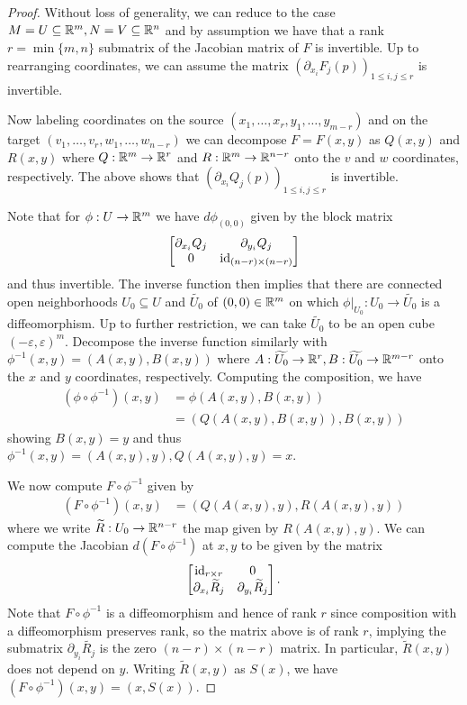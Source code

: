 \begin{proof}
    Without loss of generality, we can reduce to the case $M=U\subseteq\mathbb{R}^{m},N=V\subseteq\mathbb{R}^{n}$ and by assumption we have that a rank $r=\min\{m,n\}$ submatrix of the Jacobian matrix of $F$ is invertible. Up to rearranging coordinates, we can assume the matrix $(\partial_{x_{i}}F_{j}(p))_{1\leq i,j\leq r}$ is invertible. 

    Now labeling coordinates on the source $(x_{1},\dots,x_{r},y_{1},\dots,y_{m-r})$ and on the target $(v_{1},\dots,v_{r},w_{1},\dots,w_{n-r})$ we can decompose $F=F(x,y)$ as $Q(x,y)$ and $R(x,y)$ where $Q:\mathbb{R}^{m}\to\mathbb{R}^{r}$ and $R:\mathbb{R}^{m}\to\mathbb{R}^{n-r}$ onto the $v$ and $w$ coordinates, respectively. The above shows that $(\partial_{x_{i}}Q_{j}(p))_{1\leq i,j\leq r}$ is invertible. 

    Note that for $\phi:U\to\mathbb{R}^{m}$ we have $d\phi_{(0,0)}$ given by the block matrix 
    $$\begin{bmatrix}
        \partial_{x_{i}}Q_{j} & \partial_{y_{i}}Q_{j} \\
        0 & \mathrm{id}_{(n-r)\times(n-r)}
    \end{bmatrix}$$
    and thus invertible. The inverse function then implies that there are connected open neighborhoods $U_{0}\subseteq U$ and $\widetilde{U_{0}}$ of $(0,0)\in\mathbb{R}^{m}$ on which $\phi|_{U_{0}}:U_{0}\to\widetilde{U_{0}}$ is a diffeomorphism. Up to further restriction, we can take $\widetilde{U_{0}}$ to be an open cube $(-\varepsilon,\varepsilon)^{m}$. Decompose the inverse function similarly with $\phi^{-1}(x,y)=(A(x,y),B(x,y))$ where $A:\widetilde{U_{0}}\to\mathbb{R}^{r}, B:\widetilde{U_{0}}\to\mathbb{R}^{m-r}$ onto the $x$ and $y$ coordinates, respectively. Computing the composition, we have 
    \begin{align*}
        (\phi\circ\phi^{-1})(x,y) &= \phi(A(x,y),B(x,y)) \\
        &= \left(Q(A(x,y),B(x,y)),B(x,y)\right)
    \end{align*}
    showing $B(x,y)=y$ and thus $\phi^{-1}(x,y)=(A(x,y),y), Q(A(x,y),y)=x$. 

    We now compute $F\circ\phi^{-1}$ given by 
    \begin{align*}
        (F\circ\phi^{-1})(x,y) &= (Q(A(x,y),y),R(A(x,y),y))
    \end{align*}
    where we write $\widetilde{R}:U_{0}\to\mathbb{R}^{n-r}$ the map given by $R(A(x,y),y)$. We can compute the Jacobian $d(F\circ\phi^{-1})$ at $x,y$ to be given by the matrix 
    $$\begin{bmatrix}
        \mathrm{id}_{r\times r} & 0 \\
        \partial_{x_{i}}\widetilde{R}_{j} & \partial_{y_{i}}\widetilde{R}_{j}
    \end{bmatrix}.$$
    Note that $F\circ\phi^{-1}$ is a diffeomorphism and hence of rank $r$ since composition with a diffeomorphism preserves rank, so the matrix above is of rank $r$, implying the submatrix $\partial_{y_{i}}\widetilde{R_{j}}$ is the zero $(n-r)\times(n-r)$ matrix. In particular, $\widetilde{R}(x,y)$ does not depend on $y$. Writing $\widetilde{R}(x,y)$ as $S(x)$, we have $(F\circ\phi^{-1})(x,y)=(x,S(x))$. 


\end{proof}

